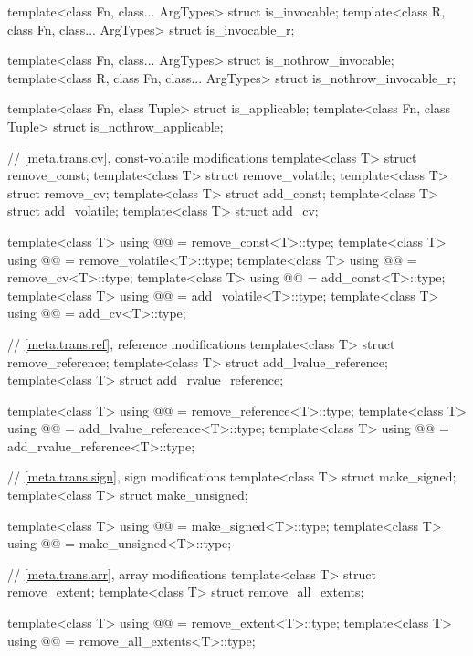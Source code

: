 \begin{codeblock}
{  template<class Fn, class... ArgTypes> struct is_invocable;
  template<class R, class Fn, class... ArgTypes> struct is_invocable_r;

  template<class Fn, class... ArgTypes> struct is_nothrow_invocable;
  template<class R, class Fn, class... ArgTypes> struct is_nothrow_invocable_r;

  template<class Fn, class Tuple> struct is_applicable;
  template<class Fn, class Tuple> struct is_nothrow_applicable;

  // \ref{meta.trans.cv}, const-volatile modifications
  template<class T> struct remove_const;
  template<class T> struct remove_volatile;
  template<class T> struct remove_cv;
  template<class T> struct add_const;
  template<class T> struct add_volatile;
  template<class T> struct add_cv;

  template<class T>
    using @@    = remove_const<T>::type;
  template<class T>
    using @@ = remove_volatile<T>::type;
  template<class T>
    using @@       = remove_cv<T>::type;
  template<class T>
    using @@       = add_const<T>::type;
  template<class T>
    using @@    = add_volatile<T>::type;
  template<class T>
    using @@          = add_cv<T>::type;

  // \ref{meta.trans.ref}, reference modifications
  template<class T> struct remove_reference;
  template<class T> struct add_lvalue_reference;
  template<class T> struct add_rvalue_reference;

  template<class T>
    using @@     = remove_reference<T>::type;
  template<class T>
    using @@ = add_lvalue_reference<T>::type;
  template<class T>
    using @@ = add_rvalue_reference<T>::type;

  // \ref{meta.trans.sign}, sign modifications
  template<class T> struct make_signed;
  template<class T> struct make_unsigned;

  template<class T>
    using @@   = make_signed<T>::type;
  template<class T>
    using @@ = make_unsigned<T>::type;

  // \ref{meta.trans.arr}, array modifications
  template<class T> struct remove_extent;
  template<class T> struct remove_all_extents;

  template<class T>
    using @@      = remove_extent<T>::type;
  template<class T>
    using @@ = remove_all_extents<T>::type;

}
\end{codeblock}
